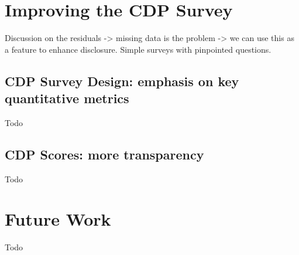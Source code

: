 \section{Improving the CDP Survey} 
Discussion on the residuals -> missing data is the problem -> we can use this as a feature to enhance disclosure. Simple surveys with pinpointed questions. 
\subsection{CDP Survey Design: emphasis on key quantitative metrics}
Todo
\subsection{CDP Scores: more transparency}
Todo
\section{Future Work}
Todo
